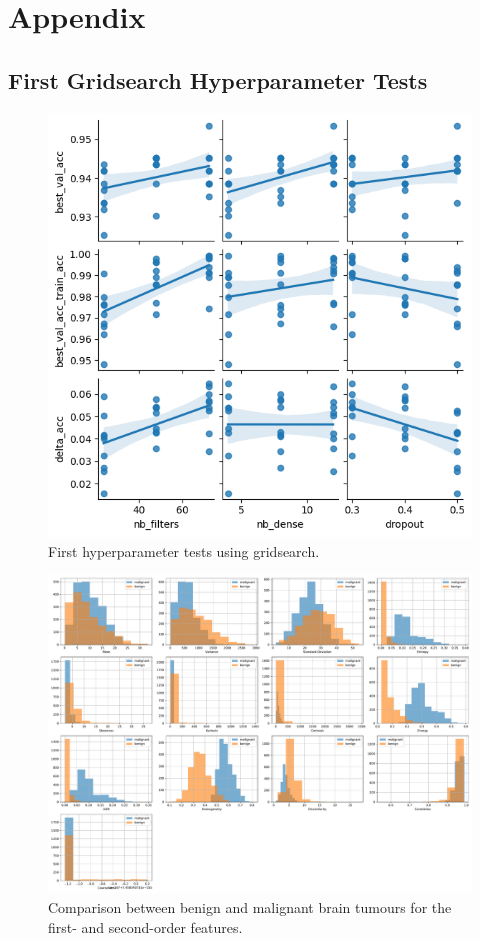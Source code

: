 \chapter{Appendix}
\label{cha:appendix}

\section{First Gridsearch Hyperparameter Tests}
\label{sec:FirstGridsearchHyperparameterTests}

\begin{figure}[H]
    \centering
    \includegraphics[width=.8\textwidth]{plots/FirstHyperparameterTests.png}
    \caption{First hyperparameter tests using gridsearch.}
    \label{fig:FirstHyperparameterTests}
\end{figure}

\begin{figure}[H]
    \centering
    \includegraphics[width=.8\textwidth]{plots/benign_malignant_comparison.pdf}
    \caption{Comparison between benign and malignant brain tumours for the first- and second-order features.}
    \label{fig:benign_malignant_comparison}
\end{figure}

